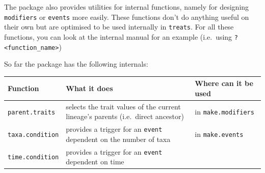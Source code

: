 \documentclass[
]{book}
\begin{document}
The package also provides utilities for internal functions, namely for designing \texttt{modifiers} or \texttt{events} more easily.
These functions don't do anything useful on their own but are optimised to be used internally in \texttt{treats}.
For all these functions, you can look at the internal manual for an example (i.e.~using \texttt{?\textless{}function\_name\textgreater{}})

So far the package has the following internals:

\begin{longtable}[]{@{}lll@{}}
\toprule
\begin{minipage}[b]{0.20\columnwidth}\raggedright
Function\strut
\end{minipage} & \begin{minipage}[b]{0.28\columnwidth}\raggedright
What it does\strut
\end{minipage} & \begin{minipage}[b]{0.43\columnwidth}\raggedright
Where can it be used\strut
\end{minipage}\tabularnewline
\midrule
\endhead
\begin{minipage}[t]{0.20\columnwidth}\raggedright
\texttt{parent.traits}\strut
\end{minipage} & \begin{minipage}[t]{0.28\columnwidth}\raggedright
selects the trait values of the current lineage's parents (i.e.~direct ancestor)\strut
\end{minipage} & \begin{minipage}[t]{0.43\columnwidth}\raggedright
in \texttt{make.modifiers}\strut
\end{minipage}\tabularnewline
\begin{minipage}[t]{0.20\columnwidth}\raggedright
\texttt{taxa.condition}\strut
\end{minipage} & \begin{minipage}[t]{0.28\columnwidth}\raggedright
provides a trigger for an \texttt{event} dependent on the number of taxa\strut
\end{minipage} & \begin{minipage}[t]{0.43\columnwidth}\raggedright
in \texttt{make.events}\strut
\end{minipage}\tabularnewline
\begin{minipage}[t]{0.20\columnwidth}\raggedright
\texttt{time.condition}\strut
\end{minipage} & \begin{minipage}[t]{0.28\columnwidth}\raggedright
provides a trigger for an \texttt{event} dependent on time\strut

\end{minipage}
\end{longtable}
\end{document}
